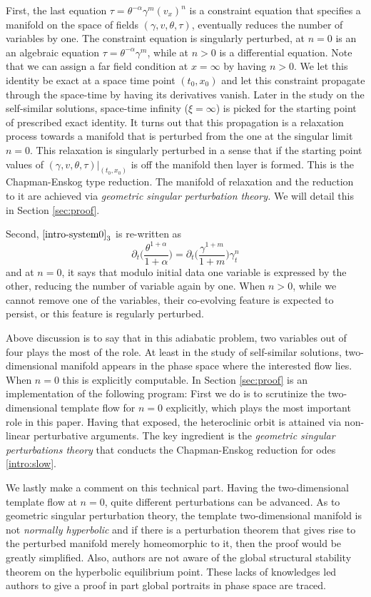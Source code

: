 \documentclass[a4paper,11pt]{article}
\begin{document}
First, the last equation $\tau=\theta^{-\alpha}\gamma^m(v_x)^n$ is a constraint equation that specifies a manifold on the space of fields $(\gamma,v,\theta,\tau)$, eventually reduces the number of variables by one. The constraint equation is singularly perturbed, at $n=0$ is an an algebraic equation $\tau=\theta^{-\alpha}\gamma^m$, while at $n>0$ is a differential equation. Note that we can assign a far field condition at $x=\infty$ by having $n>0$. We let this identity be exact at a space time point $(t_0,x_0)$ and let this constraint propagate through the space-time by having its derivatives vanish. Later in the study on the self-similar solutions, space-time infinity ($\xi=\infty$) is picked for the starting point of prescribed exact identity. It turns out that this propagation is a relaxation process towards a manifold that is perturbed from the one at the singular limit $n=0$. This relaxation is singularly perturbed in a sense that if the starting point values of $(\gamma,v,\theta,\tau)|_{(t_0,x_0)}$ is off the manifold then layer is formed. This is the Chapman-Enskog type reduction. The manifold of relaxation and the reduction to it are achieved via {\it geometric singular perturbation theory.} We will detail this in Section \ref{sec:proof}.

Second, $\eqref{intro-system0}_3$ is re-written as
$$ \partial_t\Big(\frac{\theta^{1+\alpha}}{1+\alpha}\Big) = \partial_t\Big(\frac{\gamma^{1+m}}{1+m}\Big)\gamma_t^n$$
and at $n=0$, it says that modulo initial data one variable is expressed by the other, reducing the number of variable again by one. When $n>0$, while we cannot remove one of the variables, their co-evolving feature is expected to persist, or this feature is regularly perturbed.

Above discussion is to say that in this adiabatic problem, two variables out of four plays the most of the role. At least in the study of self-similar solutions, two-dimensional manifold appears in the phase space where the interested flow lies. When $n=0$ this is explicitly computable. In Section \ref{sec:proof} is an implementation of the following program: First we do is to scrutinize the two-dimensional template flow for $n=0$ explicitly, which plays the most important role in this paper. Having that exposed, the heteroclinic orbit is attained via non-linear perturbative arguments. The key ingredient is the {\it geometric singular perturbations theory} that conducts the Chapman-Enskog reduction for odes \eqref{intro:slow}.

We lastly make a comment on this technical part. Having the two-dimensional template flow at $n=0$, quite different perturbations can be advanced. %
As to geometric singular perturbation theory, the template two-dimensional manifold is not {\it normally hyperbolic} and if there is a perturbation theorem that gives rise to the perturbed manifold merely homeomorphic to it, then the proof would be greatly simplified. Also, authors are not aware of the global structural stability theorem on the hyperbolic equilibrium point. These lacks of knowledges led authors to give a proof in part global portraits in phase space are traced.
\end{document}
